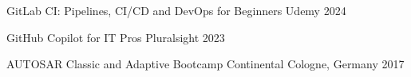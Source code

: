 

\begin{cvhonors}

  \cvhonor
    {GitLab CI: Pipelines, CI/CD and DevOps for Beginners} %
    {Udemy} %
    {} %
    {2024} %

  \cvhonor
    {GitHub Copilot for IT Pros} %
    {Pluralsight} %
    {} %
    {2023} %

  \cvhonor
  {AUTOSAR Classic and Adaptive Bootcamp} %
  {Continental} %
  {Cologne, Germany} %
  {2017} %

\end{cvhonors}
